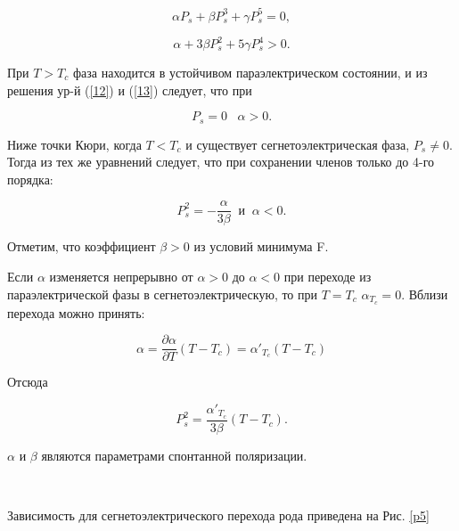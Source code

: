 \documentclass[a4paper]{article}
\begin{document}
\begin{equation}
\alpha P_s + \beta P^3_s + \gamma P^5_s = 0,
\label{12}
\end{equation}

\begin{equation}
\alpha + 3\beta P^2_s + 5\gamma P^4_s > 0. 
\label{13}
\end{equation}

При $T > T_c$ фаза находится в устойчивом параэлектрическом состоянии, и из решения ур-й (\ref{12}) и (\ref{13}) следует, что при 

\begin{equation}
P_s = 0 \; \; \; \alpha > 0. 
\label{14}
\end{equation}

Ниже точки Кюри, когда $T < T_c$ и существует сегнетоэлектрическая фаза, $P_s \neq 0$. Тогда из тех же уравнений следует, что при сохранении членов только до 4-го порядка:

\begin{equation}
P^2_s = -\frac{\alpha}{3 \beta} \; \; \text{и} \; \; \alpha < 0. 
\label{15}
\end{equation}

Отметим, что коэффициент $\beta > 0$ из условий минимума F.  

Если $\alpha$ изменяется непрерывно от $\alpha > 0$ до $\alpha < 0$ при переходе из параэлектрической фазы в сегнетоэлектрическую, то при $T = T_c$   $\alpha_{T_c} = 0$. Вблизи перехода можно принять:

\begin{equation}
\alpha = \frac{\partial \alpha}{\partial T} (T - T_c) = \alpha'_{T_c} (T - T_c)
\label{16}
\end{equation}

Отсюда

\begin{equation}
P^2_s = \frac{\alpha'_{T_c}}{3\beta} (T - T_c). 
\label{17}
\end{equation}

$\alpha$ и $\beta$ являются параметрами спонтанной поляризации. 

\ 

Зависимость для сегнетоэлектрического перехода  рода приведена на Рис. \ref{p5} 
\end{document}

